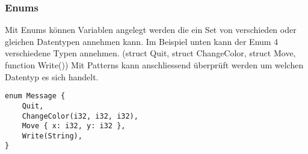 \subsubsection{Enums}

Mit Enums können Variablen angelegt werden die ein Set von verschieden oder gleichen Datentypen annehmen kann.
Im Beispiel unten kann der Enum 4 verschiedene Typen annehmen. (struct Quit, struct ChangeColor, struct Move, function Write())
Mit Patterns kann anschliessend überprüft werden um welchen Datentyp es sich handelt.
\begin{lstlisting}
enum Message {
	Quit,
	ChangeColor(i32, i32, i32),
	Move { x: i32, y: i32 },
	Write(String),
}
\end{lstlisting}